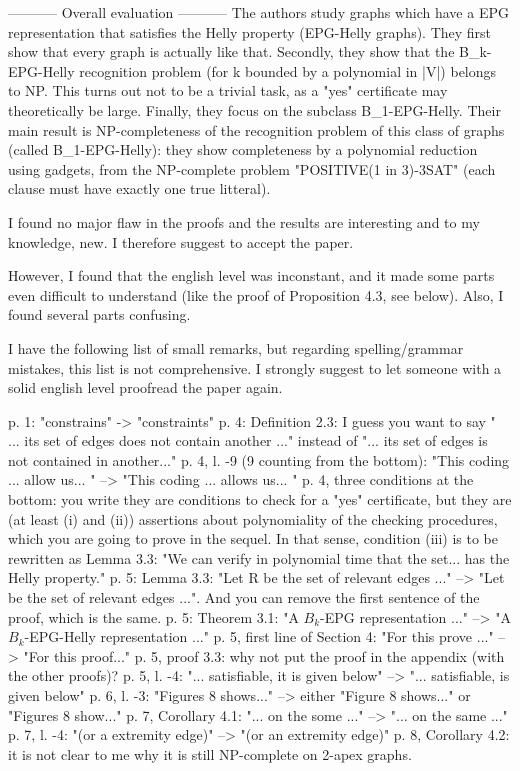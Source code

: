 ----------- Overall evaluation -----------
The authors study graphs which have a EPG representation that satisfies the Helly property (EPG-Helly graphs). They first show that every graph is actually like that. Secondly, they show that the B_k-EPG-Helly recognition problem (for k bounded by a polynomial in |V|) belongs to NP. This turns out not to be a trivial task, as a "yes" certificate may theoretically be large. Finally, they focus on the subclass B_1-EPG-Helly. Their main result is NP-completeness of the recognition problem of this class of graphs (called B_1-EPG-Helly): they show completeness by a polynomial reduction using gadgets, from the NP-complete problem "POSITIVE(1 in 3)-3SAT" (each clause must have exactly one true litteral).

I found no major flaw in the proofs and the results are interesting and to my knowledge, new. I therefore suggest to accept the paper.

However, I found that the english level was inconstant, and it made some parts even difficult to understand (like the proof of Proposition 4.3, see below). Also, I found several parts confusing.

I have the following list of small remarks, but regarding spelling/grammar mistakes, this list is not comprehensive. I strongly suggest to let someone with a solid english level proofread the paper again.

p. 1: "constrains" -> "constraints"
p. 4: Definition 2.3: I guess you want to say " ... its set of edges does not contain another ..." instead of "... its set of edges is not contained in another..."
p. 4, l. -9 (9 counting from the bottom): "This coding ... allow us... " --> "This coding ... allows us... "
p. 4,  three conditions at the bottom: you write they are conditions to check for a "yes" certificate, but they are (at least (i) and (ii)) assertions about polynomiality of the checking procedures, which you are going to prove in the sequel. In that sense, condition (iii) is to be rewritten as Lemma 3.3: "We can verify in polynomial time that the set... has the Helly property."
p. 5: Lemma 3.3: "Let R be the set of relevant edges ..." --> "Let  be the set of relevant edges ...". And you can remove the first sentence of the proof, which is the same.
p. 5: Theorem 3.1: "A $B_k$-EPG representation ..." -->  "A $B_k$-EPG-Helly representation ..."
p. 5, first line of Section 4: "For this prove ..." --> "For this proof..."
p. 5, proof 3.3: why not put the proof in the appendix (with the other proofs)?
p. 5, l. -4: "... satisfiable, it is given below" --> "... satisfiable, is given below"
p. 6, l. -3: "Figures 8 shows..." -->  either "Figure 8 shows..."  or "Figures 8 show..."
p. 7, Corollary 4.1: "... on the some ..." --> "... on the same ..."
p. 7, l. -4: "(or a extremity edge)" --> "(or an extremity edge)"
p. 8, Corollary 4.2: it is not clear to me why it is still NP-complete on 2-apex graphs.


